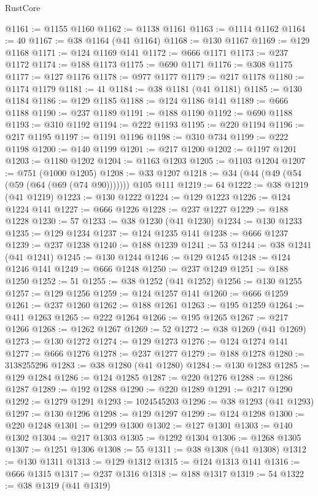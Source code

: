 \begin{lexlean}{RustCore}
\begin{coremodule}
@1161 := @1155 @1160
@1162 := @1138 @1161
@1163 := @1114 @1162
@1164 := 40
@1167 := @38 @1164 (@41 @1164)
@1168 := @130 @1167
@1169 := @129 @1168
@1171 := @124 @1169 @141
@1172 := @666 @1171
@1173 := @237 @1172
@1174 := @188 @1173
@1175 := @690 @1171
@1176 := @308 @1175
@1177 := @127 @1176
@1178 := @977 @1177
@1179 := @217 @1178
@1180 := @1174 @1179
@1181 := 41
@1184 := @38 @1181 (@41 @1181)
@1185 := @130 @1184
@1186 := @129 @1185
@1188 := @124 @1186 @141
@1189 := @666 @1188
@1190 := @237 @1189
@1191 := @188 @1190
@1192 := @690 @1188
@1193 := @310 @1192
@1194 := @222 @1193
@1195 := @220 @1194
@1196 := @217 @1195
@1197 := @1191 @1196
@1198 := @310 @734
@1199 := @222 @1198
@1200 := @140 @1199
@1201 := @217 @1200
@1202 := @1197 @1201
@1203 := @1180 @1202
@1204 := @1163 @1203
@1205 := @1103 @1204
@1207 := @751 (@1000 @1205)
@1208 := @33 @1207
@1218 := @34 (@44 (@49 (@54 (@59 (@64 (@69 (@74 @90))))))) @105 @111
@1219 := 64
@1222 := @38 @1219 (@41 @1219)
@1223 := @130 @1222
@1224 := @129 @1223
@1226 := @124 @1224 @141
@1227 := @666 @1226
@1228 := @237 @1227
@1229 := @188 @1228
@1230 := 57
@1233 := @38 @1230 (@41 @1230)
@1234 := @130 @1233
@1235 := @129 @1234
@1237 := @124 @1235 @141
@1238 := @666 @1237
@1239 := @237 @1238
@1240 := @188 @1239
@1241 := 53
@1244 := @38 @1241 (@41 @1241)
@1245 := @130 @1244
@1246 := @129 @1245
@1248 := @124 @1246 @141
@1249 := @666 @1248
@1250 := @237 @1249
@1251 := @188 @1250
@1252 := 51
@1255 := @38 @1252 (@41 @1252)
@1256 := @130 @1255
@1257 := @129 @1256
@1259 := @124 @1257 @141
@1260 := @666 @1259
@1261 := @237 @1260
@1262 := @188 @1261
@1263 := @195 @1259
@1264 := @411 @1263
@1265 := @222 @1264
@1266 := @195 @1265
@1267 := @217 @1266
@1268 := @1262 @1267
@1269 := 52
@1272 := @38 @1269 (@41 @1269)
@1273 := @130 @1272
@1274 := @129 @1273
@1276 := @124 @1274 @141
@1277 := @666 @1276
@1278 := @237 @1277
@1279 := @188 @1278
@1280 := 3138255296
@1283 := @38 @1280 (@41 @1280)
@1284 := @130 @1283
@1285 := @129 @1284
@1286 := @124 @1285
@1287 := @220 @1276
@1288 := @1286 @1287
@1289 := @192 @1288
@1290 := @220 @1289
@1291 := @217 @1290
@1292 := @1279 @1291
@1293 := 1024545203
@1296 := @38 @1293 (@41 @1293)
@1297 := @130 @1296
@1298 := @129 @1297
@1299 := @124 @1298
@1300 := @220 @1248
@1301 := @1299 @1300
@1302 := @127 @1301
@1303 := @140 @1302
@1304 := @217 @1303
@1305 := @1292 @1304
@1306 := @1268 @1305
@1307 := @1251 @1306
@1308 := 55
@1311 := @38 @1308 (@41 @1308)
@1312 := @130 @1311
@1313 := @129 @1312
@1315 := @124 @1313 @141
@1316 := @666 @1315
@1317 := @237 @1316
@1318 := @188 @1317
@1319 := 54
@1322 := @38 @1319 (@41 @1319)

\end{coremodule}
\end{lexlean}
